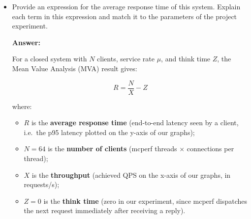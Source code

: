 \begin{enumerate}[label=(\alph*)]
\begin{itemize}
\begin{center}
\end{center}

The $N=64$ clients form a closed loop.
Each client sends a GET/SET request to the memcached server
(modelled as a single \textbf{M/M/1} queue with service rate $\mu$),waits for the response, and immediately issues the next request(think time $Z=0$).The queue in front of the server accumulates requests when the
arrival rate approaches $\mu$.

        \item Provide an expression for the average response time of this system. Explain each term in this expression and match it to the parameters of the project experiment.
        
        \textbf{Answer:} 

        For a closed system with $N$ clients, service rate $\mu$, and think
        time $Z$, the Mean Value Analysis (MVA) result gives:
        
        \[
          \boxed{R = \frac{N}{X} - Z}
        \]
        
        where:
        \begin{itemize}
          \item $R$ is the \textbf{average response time} (end-to-end latency
                seen by a client, i.e.\ the p95 latency plotted on the y-axis
                of our graphs);
          \item $N = 64$ is the \textbf{number of clients} (mcperf threads
                $\times$ connections per thread);
          \item $X$ is the \textbf{throughput} (achieved QPS on the x-axis
                of our graphs, in requests/s);
          \item $Z = 0$ is the \textbf{think time} (zero in our experiment,
                since mcperf dispatches the next request immediately after
                receiving a reply).
        \end{itemize}
        

\end{itemize}
\end{enumerate}
